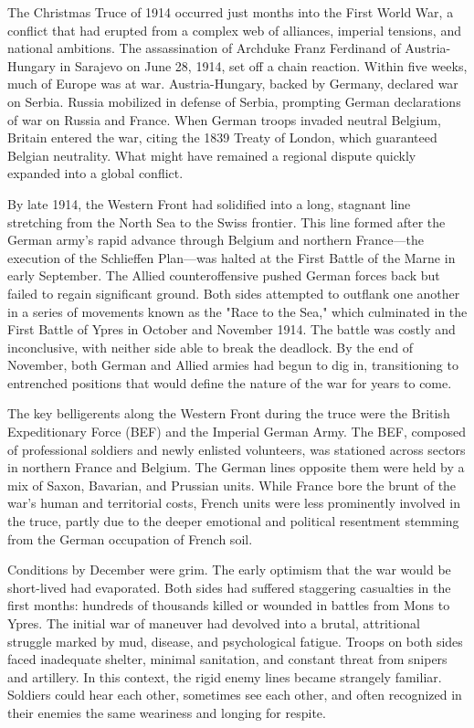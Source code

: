 \begin{historical}
The Christmas Truce of 1914 occurred just months into the First World War, a conflict that had erupted from a complex web of alliances, imperial tensions, and national ambitions. The assassination of Archduke Franz Ferdinand of Austria-Hungary in Sarajevo on June 28, 1914, set off a chain reaction. Within five weeks, much of Europe was at war. Austria-Hungary, backed by Germany, declared war on Serbia. Russia mobilized in defense of Serbia, prompting German declarations of war on Russia and France. When German troops invaded neutral Belgium, Britain entered the war, citing the 1839 Treaty of London, which guaranteed Belgian neutrality. What might have remained a regional dispute quickly expanded into a global conflict.

By late 1914, the Western Front had solidified into a long, stagnant line stretching from the North Sea to the Swiss frontier. This line formed after the German army’s rapid advance through Belgium and northern France—the execution of the Schlieffen Plan—was halted at the First Battle of the Marne in early September. The Allied counteroffensive pushed German forces back but failed to regain significant ground. Both sides attempted to outflank one another in a series of movements known as the "Race to the Sea," which culminated in the First Battle of Ypres in October and November 1914. The battle was costly and inconclusive, with neither side able to break the deadlock. By the end of November, both German and Allied armies had begun to dig in, transitioning to entrenched positions that would define the nature of the war for years to come.

The key belligerents along the Western Front during the truce were the British Expeditionary Force (BEF) and the Imperial German Army. The BEF, composed of professional soldiers and newly enlisted volunteers, was stationed across sectors in northern France and Belgium. The German lines opposite them were held by a mix of Saxon, Bavarian, and Prussian units. While France bore the brunt of the war’s human and territorial costs, French units were less prominently involved in the truce, partly due to the deeper emotional and political resentment stemming from the German occupation of French soil.

Conditions by December were grim. The early optimism that the war would be short-lived had evaporated. Both sides had suffered staggering casualties in the first months: hundreds of thousands killed or wounded in battles from Mons to Ypres. The initial war of maneuver had devolved into a brutal, attritional struggle marked by mud, disease, and psychological fatigue. Troops on both sides faced inadequate shelter, minimal sanitation, and constant threat from snipers and artillery. In this context, the rigid enemy lines became strangely familiar. Soldiers could hear each other, sometimes see each other, and often recognized in their enemies the same weariness and longing for respite.

\end{historical}
